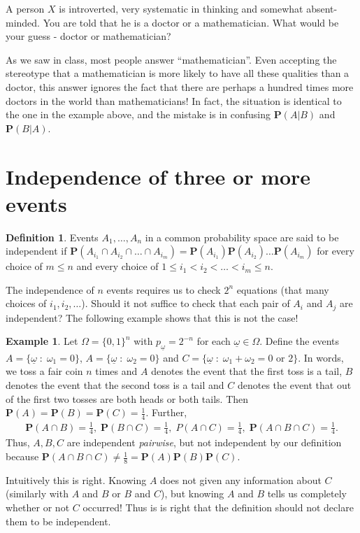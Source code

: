 \documentclass[preprint,  11pt]{amsart}
\newcommand{\para}[1]{\vspace{4mm}\noindent{\bfseries #1:}}
\theoremstyle{plain} %
\theoremstyle{definition} %
\newtheorem{definition}[theorem]{Definition}
\newtheorem{example}[theorem]{Example}
\begin{document}
\para{Question} A person $X$ is introverted,  very systematic in thinking and somewhat absent-minded. You are told that he is a doctor or a mathematician. What would be your guess - doctor or mathematician?

As we saw in class, most people answer ``mathematician''. Even accepting the stereotype that a mathematician is more likely to have all these qualities than a doctor, this answer ignores the fact that there are perhaps a hundred times more doctors in the world than mathematicians! In fact, the situation is identical to the one in the example above, and the mistake is in confusing $\mathbf{P}(A\big| B)$ and $\mathbf{P}(B\big| A)$.


\section{Independence of three or more events} 
\begin{definition} Events $A_{1},\ldots ,A_{n}$ in a common probability space are said to be independent if
$
\mathbf{P}\left(A_{i_{1}}\cap A_{i_{2}}\cap \ldots \cap A_{i_{m}}\right)=\mathbf{P}(A_{i_{1}})\mathbf{P}(A_{i_{2}})\ldots \mathbf{P}(A_{i_{m}})$ for every choice of $m\le n$ and every choice of $1\le i_{1}<i_{2}<\ldots <i_{m}\le n$.
\end{definition}
 The independence of $n$ events requires us to check $2^{n}$ equations (that many choices of $i_{1},i_{2},\ldots$). Should it not suffice to check that each pair of $A_{i}$ and $A_{j}$ are independent? The following example shows that this is not the case!
\begin{example} Let $\Omega=\{0,1\}^{n}$ with $p_{\underline{\omega}}=2^{-n}$ for each $\underline{\omega}\in \Omega$. Define the events $A=\{\underline{\omega}{\; : \;} \omega_{1}=0\}$, $A=\{\underline{\omega}{\; : \;} \omega_{2}=0\}$ and $C=\{\underline{\omega}{\; : \;} \omega_{1}+\omega_{2}=0 \mbox{ or }2\}$. In words, we toss a fair coin $n$ times and $A$ denotes the event that the first toss is a tail, $B$ denotes the event that the second toss is a tail and $C$ denotes the event that out of the first two tosses are both heads or both tails. Then $\mathbf{P}(A)=\mathbf{P}(B)=\mathbf{P}(C)=\frac{1}{4}$. Further, 
\[\begin{aligned}
\mathbf{P}(A\cap B)=\frac{1}{4}, \; \mathbf{P}(B\cap C)=\frac{1}{4}, \; P(A\cap C)=\frac{1}{4}, \; \mathbf{P}(A\cap B\cap C)=\frac{1}{4}.
\end{aligned}\]
Thus,  $A,B,C$ are independent {\em pairwise}, but not independent by our definition because $\mathbf{P}(A\cap B\cap C)\not= \frac{1}{8}=\mathbf{P}(A)\mathbf{P}(B)\mathbf{P}(C)$.

Intuitively this is right. Knowing $A$ does not given any information about $C$ (similarly with $A$ and $B$ or $B$ and $C$), but knowing $A$ and $B$ tells us completely whether or not $C$ occurred! Thus is is right that the definition should not declare them to be independent.
\end{example}
\end{document}

